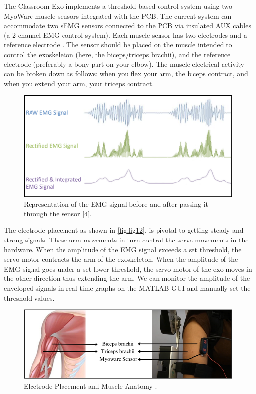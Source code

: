 The Classroom Exo implements a threshold-based control system using two MyoWare muscle sensors integrated with the PCB. The current system can accommodate two sEMG sensors connected to the PCB via insulated AUX cables (a 2-channel EMG control system). Each muscle sensor has two electrodes and a reference electrode \cite{AlTashi2024}. The sensor should be placed on the muscle intended to control the exoskeleton (here, the biceps/triceps brachii), and the reference electrode (preferably a bony part on your elbow). The muscle electrical activity can be broken down as follows: when you flex your arm, the biceps contract, and when you extend your arm, your triceps contract. 

\begin{figure}
	\centering
	\includegraphics[width=0.7\linewidth]{img/fig_12}
	\caption{Representation of the EMG signal before and after passing it through the sensor [4].}
	\label{fig:fig12}
\end{figure}

The electrode placement as shown in \autoref{fig:fig12}, is pivotal to getting steady and strong signals. These arm movements in turn control the servo movements in the hardware. When the amplitude of the EMG signal exceeds a set threshold, the servo motor contracts the arm of the exoskeleton. When the amplitude of the EMG signal goes under a set lower threshold, the servo motor of the exo moves in the other direction thus extending the arm. We can monitor the amplitude of the enveloped signals in real-time graphs on the MATLAB GUI and manually set the threshold values. 

\begin{figure}
	\centering
	\includegraphics[width=0.7\linewidth]{img/fig_13}
	\caption{Electrode Placement and Muscle Anatomy \cite{Muscles}. }
	\label{fig:fig13}
\end{figure}


